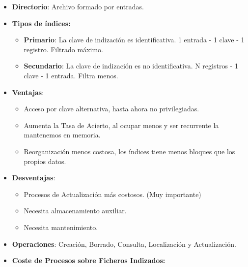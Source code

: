 \documentclass[12pt, twoside, openright]{report} %
\begin{document}
\begin{itemize}
\begin{itemize}
    \end{itemize}
  \item \textbf{Directorio}: Archivo formado por entradas.
    
  \item \textbf{Tipos de índices:}
    

    \begin{itemize}
    \item \textbf{Primario}: La clave de indización es identificativa. 
    1 entrada - 1 clave - 1 registro. Filtrado máximo.
      
    \item \textbf{Secundario}: La clave de indización es no identificativa.
      N registros - 1 clave - 1 entrada. Filtra menos.
      
    \end{itemize}
  \item \textbf{Ventajas}:
    

    \begin{itemize}
    \item Acceso por clave alternativa, hasta ahora no privilegiadas.
      
    \item Aumenta la Tasa de Acierto, al ocupar menos y ser recurrente la
      mantenemos en memoria.
      
    \item Reorganización menos costosa, los índices tiene menos bloques que
      los propios datos.
      
    \end{itemize}
	\pagebreak
  \item \textbf{Desventajas}:
    

    \begin{itemize}
    \item Procesos de Actualización más costosos. (Muy importante)
      
    \item Necesita almacenamiento auxiliar.
      
    \item Necesita mantenimiento.
      
    \end{itemize}
  \item \textbf{Operaciones}: Creación, Borrado, Consulta, Localización y
    Actualización.
    
  \item \textbf{Coste de Procesos sobre Ficheros Indizados:}
    


\end{itemize}
\end{document}
